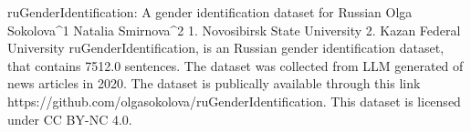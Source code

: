 
ruGenderIdentification: A gender identification dataset for Russian
Olga Sokolova^1 Natalia Smirnova^2
1. Novosibirsk State University 2. Kazan Federal University
ruGenderIdentification, is an Russian gender identification dataset, that contains 7512.0 sentences.
The dataset was collected from LLM generated of news articles in 2020. 
The dataset is publically available through this link https://github.com/olgasokolova/ruGenderIdentification. This dataset is licensed under CC BY-NC 4.0.

